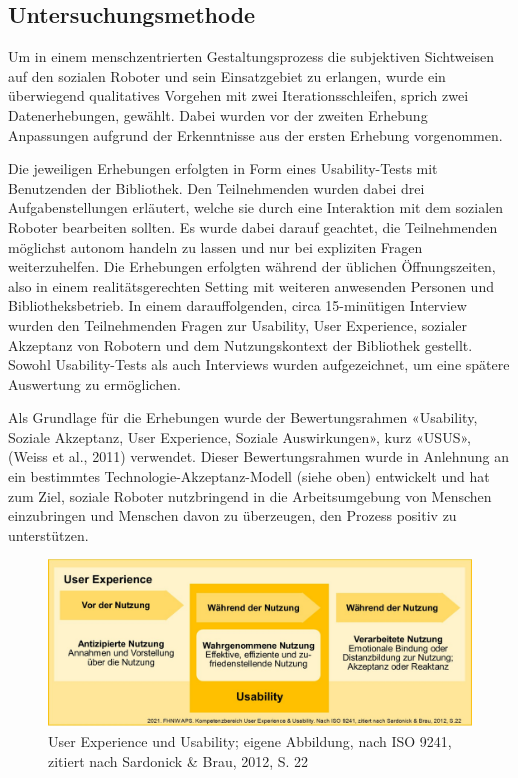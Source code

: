 \documentclass[a4paper,
fontsize=11pt,
oneside,
numbers=noperiodatend,
parskip=half-,
bibliography=totoc,
final
]{scrartcl}
\begin{document}
\hypertarget{untersuchungsmethode}{%
\subsection{Untersuchungsmethode}\label{untersuchungsmethode}}

Um in einem menschzentrierten Gestaltungsprozess die subjektiven
Sichtweisen auf den sozialen Roboter und sein Einsatzgebiet zu erlangen,
wurde ein überwiegend qualitatives Vorgehen mit zwei
Iterationsschleifen, sprich zwei Datenerhebungen, gewählt. Dabei wurden
vor der zweiten Erhebung Anpassungen aufgrund der Erkenntnisse aus der
ersten Erhebung vorgenommen.

Die jeweiligen Erhebungen erfolgten in Form eines Usability-Tests mit
Benutzenden der Bibliothek. Den Teilnehmenden wurden dabei drei
Aufgabenstellungen erläutert, welche sie durch eine Interaktion mit dem
sozialen Roboter bearbeiten sollten. Es wurde dabei darauf geachtet, die
Teilnehmenden möglichst autonom handeln zu lassen und nur bei expliziten
Fragen weiterzuhelfen. Die Erhebungen erfolgten während der üblichen
Öffnungszeiten, also in einem realitätsgerechten Setting mit weiteren
anwesenden Personen und Bibliotheksbetrieb. In einem darauffolgenden,
circa 15-minütigen Interview wurden den Teilnehmenden Fragen zur
Usability, User Experience, sozialer Akzeptanz von Robotern und dem
Nutzungskontext der Bibliothek gestellt. Sowohl Usability-Tests als auch
Interviews wurden aufgezeichnet, um eine spätere Auswertung zu
ermöglichen.

Als Grundlage für die Erhebungen wurde der Bewertungsrahmen «Usability,
Soziale Akzeptanz, User Experience, Soziale Auswirkungen», kurz «USUS»,
(Weiss et al., 2011) verwendet. Dieser Bewertungsrahmen wurde in
Anlehnung an ein bestimmtes Technologie-Akzeptanz-Modell (siehe oben)
entwickelt und hat zum Ziel, soziale Roboter nutzbringend in die
Arbeitsumgebung von Menschen einzubringen und Menschen davon zu
überzeugen, den Prozess positiv zu unterstützen.

\begin{figure}
\centering
\includegraphics[width=.8\textwidth]{img/UX-Usability.jpg}
\caption{User Experience und Usability; eigene Abbildung,
nach ISO 9241, zitiert nach Sardonick \& Brau, 2012, S. 22}
\end{figure}
\end{document}

